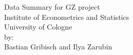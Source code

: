 

\begin{titlepage}

\thispagestyle{empty}   %


\begin{center}
\vspace*{2.cm}
{\textbf  \Large Data Summary for GZ project} \\
\vspace*{2cm}
\vspace{0.5cm}
Institute of Econometrics and Statistics\\
University of Cologne\\
\vspace*{0.5cm}
by:\\
Bastian Gribisch and Ilya Zarubin\\
\vspace*{0.5cm}

\end{center}




\end{titlepage}

